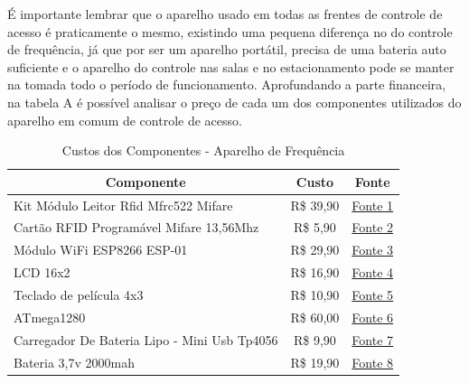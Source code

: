 É importante lembrar que o aparelho usado em todas as frentes de controle de
acesso é praticamente o mesmo, existindo uma pequena diferença no do controle de
frequência, já que por ser um aparelho portátil, precisa de uma bateria auto
suficiente e o aparelho do controle nas salas e no estacionamento pode se manter
na tomada todo o período de funcionamento. Aprofundando a parte financeira, na
tabela A é possível analisar o preço de cada um dos componentes utilizados do
aparelho em comum de controle de acesso.


\begin{table}[!h]
  \centering
  \caption{Custos dos Componentes - Aparelho de Frequência}
  \label{my-label}
    \begin{tabular}{|l|c|c|}
    \hline
    \multicolumn{1}{|c|}{\textbf{Componente}}    & \textbf{Custo} & \textbf{Fonte}                                                                                                \\ \hline
    \parbox[t]{7cm}{Kit Módulo Leitor Rfid Mfrc522 Mifare}        & R\$ 39,90      & \href{http://www.filipeflop.com/pd-6b883-kit-modulo-leitor-rfid-mfrc522-mifare.html}{Fonte 1}                                 \\ \hline
    \parbox[t]{7cm}{Cartão RFID Programável Mifare 13,56Mhz}      & R\$ 5,90       & \href{http://www.filipeflop.com/pd-1c240a-cartao-rfid-programavel-mifare-13-56mhz.html}{Fonte 2}                              \\ \hline
    Módulo WiFi ESP8266 ESP-01                   & R\$ 29,90      & \href{http://www.filipeflop.com/pd-1f55ad-modulo-wifi-esp8266-esp-01.html}{Fonte 3}                                           \\ \hline
    LCD 16x2                                     & R\$ 16,90      & \href{http://www.filipeflop.com/pd-6b7e4-display-lcd-16x2.html?ct=\&p=1\&s=1}{Fonte 4}                                        \\ \hline
    Teclado de película 4x3                      & R\$ 10,90      & \href{http://www.filipeflop.com/pd-218a98-teclado-matricial-de-membrana-12-teclas.html?ct=\&p=1\&s=1}{Fonte 5}                \\ \hline
    ATmega1280                                   & R\$ 60,00      & \href{http://produto.mercadolivre.com.br/MLB-831270785-lote-5-pecas-atmega1280-16au-marca-atmel-100-tqfp-atmel-\_JM}{Fonte 6} \\ \hline
    \parbox[t]{7cm}{Carregador De Bateria Lipo - Mini Usb Tp4056} & R\$ 9,90       & \href{http://www.filipeflop.com/pd-36ef09-modulo-carregador-de-baterias-de-litio-tp4056.html?ct=\&p=1\&s=1}{Fonte 7}          \\ \hline
    Bateria 3,7v 2000mah                         & R\$ 19,90      & \href{http://produto.mercadolivre.com.br/MLB-763262237-bateria-tablet-universal-dl-navcity-phaser-37v-2000mah-\_JM}{Fonte 8}  \\ \hline
\end{tabular}
\end{table}


